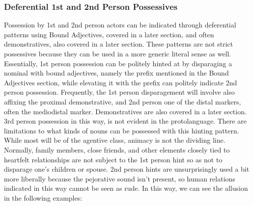     \subsubsection{Deferential 1st and 2nd Person Possessives}
    Possession by 1st and 2nd person actors can be indicated through deferential patterns using Bound Adjectives, covered in a later section, and often demonstratives, also covered in a later section. These patterns are not strict possessives because they can be used in a more generic literal sense as well. Essentially, 1st person possession can be politely hinted at by disparaging a nominal with bound adjectives, namely the \prefixtext{\boundbad} prefix mentioned in the Bound Adjectives section, while elevating it with the \prefixtext{\boundtrue} prefix can politely indicate 2nd person possession. Frequently, the 1st person disparagement will involve also affixing the proximal demonstrative, and 2nd person one of the distal markers, often the mediodistal marker. Demonstratives are also covered in a later section. 3rd person possession in this way, is not evident in the protolanguage.
    There are limitations to what kinds of nouns can be possessed with this hinting pattern. While most will be of the agentive class, animacy is not the dividing line. Normally, family members, close friends, and other elements closely tied to heartfelt relationships are not subject to the 1st person hint so as not to disparage one's children or spouse. 2nd person hints are unsurprisingly used a bit more liberally because the pejorative sound isn't present, so human relations indicated in this way cannot be seen as rude. In this way, we can see the allusion in the following examples:
    \par

